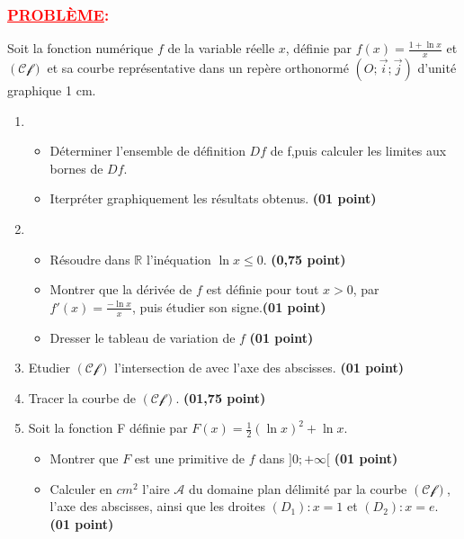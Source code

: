 \documentclass[12pt]{article}
\begin{document}
\subsubsection*{\textcolor{red}{\underline{PROBLÈME}:}}
Soit la fonction numérique $f$ de la variable réelle $x$, définie par $f(x)=\frac{1+\ln x}{x}$ et $(\mathscr{Cf})$ et sa courbe représentative dans un repère orthonormé $(O;\vec{i};\vec{j})$ d'unité graphique 1 cm.
\begin{enumerate}
\item 
\begin{itemize}
\item[a.] Déterminer l'ensemble  de définition $Df$ de f,puis calculer les limites aux bornes  de $Df$.
\item[b.] Iterpréter graphiquement les résultats obtenus. \textbf{(01 point)}
\end{itemize}
\item 
\begin{itemize}
\item[a.] Résoudre dans $\mathbb{R}$ l'inéquation $\ln x \leq 0$. \textbf{(0,75 point)}
\item[b.] Montrer que la dérivée de $f$ est définie pour tout $x>0$, par $f'(x)=\frac{-\ln x}{x}$, puis étudier son signe.\textbf{(01 point)}
\item[c.] Dresser le tableau de variation de $f$ \textbf{(01 point)}
\end{itemize}
\item Etudier $(\mathscr{Cf})$ l'intersection de avec l'axe des abscisses. \textbf{(01 point)}
\item Tracer la courbe de $(\mathscr{Cf})$.  \textbf{(01,75 point)}
\item Soit  la fonction F définie par $F(x)=\frac{1}{2}(\ln x)^{2}+\ln x.$
\begin{itemize}
\item[a.] Montrer que $F$ est une primitive de $f$ dans $]0; +\infty[$ \textbf{(01 point)}
\item[b.] Calculer en $cm^{2}$ l'aire $\mathscr{A}$ du domaine plan délimité par la courbe $(\mathscr{Cf})$, l'axe des abscisses, ainsi que les droites $(D_{1}): x=1$ et $(D_{2}): x=e$. \textbf{(01 point)}
\end{itemize}
\end{enumerate}
\end{document}
